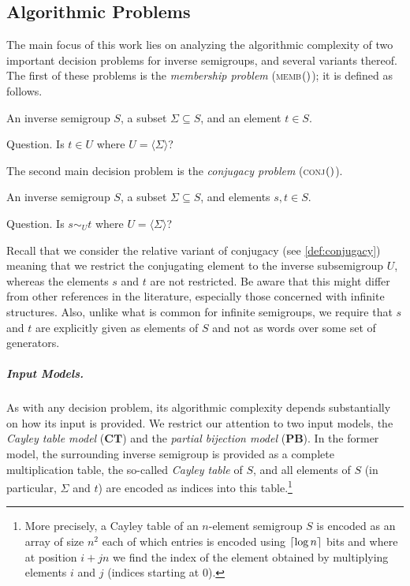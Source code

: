 \documentclass[anonymous,letter,UKenglish,cleveref,autoref,thm-restate]{lipics-v2021}
\makeatletter
\newcommand{\sse}{\subseteq}
\newcommand{\ceil}[1] {\ensuremath\left\lceil#1\right\rceil}
\newcommand{\gen}[1]{\langle #1 \rangle}
\theoremstyle{plain}
\theoremstyle{plain}
\providecommand\iitem{}
\providecommand\qitem{}
\newcommand\decproblem@iitem@label{\rlap{Input.}\phantom{Question.}}
\newcommand\decproblem@qitem@label{Question.}
\newenvironment{decproblem}{\begin{description}\begin{samepage}\renewcommand{\iitem}{\item[\decproblem@iitem@label]}\renewcommand{\qitem}{\item[\decproblem@qitem@label]}}{\end{samepage}\end{description}}
\newcommand{\dMemb}[2][]{\textup{\textsc{memb${}_{\mathbf{#1}}\expandafter\ifx\expandafter\relax\detokenize{#2}\relax\else(#2)\fi$}}}
\newcommand{\dConj}[2][]{\textup{\textsc{conj${}_{\mathbf{#1}}\expandafter\ifx\expandafter\relax\detokenize{#2}\relax\else(#2)\fi$}}}
\newcommand{\mysubparagraph}[1]{\vspace*{-2mm}\subparagraph*{#1}}
\makeatother
\begin{document}
\subsection{Algorithmic Problems}
\label{sec:prelims-problems}

The main focus of this work lies on analyzing the algorithmic complexity of two important decision problems for inverse semigroups, and several variants thereof.
The first of these problems is the \emph{membership problem} (\dMemb{}); it is defined as follows.

\begin{decproblem}
  \iitem An inverse semigroup $S$, a subset $\Sigma \sse S$, and an element $t \in S$.
  \qitem Is $t \in U$ where $U = \gen{\Sigma}$?
\end{decproblem}

\noindent
The second main decision problem is the \emph{conjugacy problem} (\dConj{}).

\begin{decproblem}
	\iitem An inverse semigroup $S$, a subset $\Sigma \sse S$, and elements $s,t \in S$.
	\qitem Is $s \sim_U t$ where $U = \gen{\Sigma}$?
\end{decproblem}

Recall that we consider the relative variant of conjugacy (see \cref{def:conjugacy}) meaning that we restrict the conjugating element to the inverse subsemigroup $U$, whereas the elements $s$ and $t$ are not restricted. 
Be aware that this might differ from other references in the literature, especially those concerned with infinite structures. 
Also, unlike what is common for infinite semigroups, we require that $s$ and $t$ are explicitly given as elements of $S$ and not as words over some set of generators.


\mysubparagraph{Input Models.}
As with any decision problem, its algorithmic complexity depends substantially on how its input is provided.
We restrict our attention to two input models, the \emph{Cayley table model} ($\mathbf{CT}$) and the \emph{partial bijection model} ($\mathbf{PB}$).
In the former model, the surrounding inverse semigroup is provided as a complete multiplication table, the so-called \emph{Cayley table} of $S$, and all elements of $S$ (in particular, $\Sigma$ and $t$) are encoded as indices into this table.\footnote{More precisely, a Cayley table of an $n$-element semigroup $S$ is encoded as an array of size $n^2$ each of which entries is encoded using $\ceil{\log n}$ bits and where at position $i + jn$ we find the index of the element obtained by multiplying elements $i$ and $j$ (indices starting at $0$).}
\end{document}
